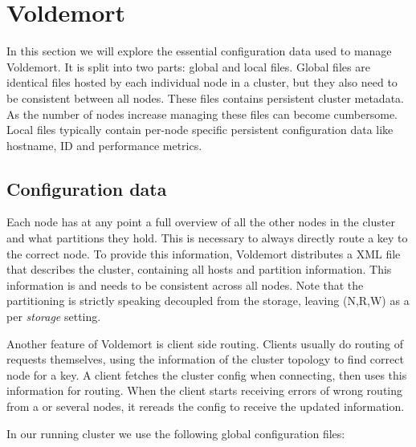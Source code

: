 

\section{Voldemort}
\label{sec:voldemort}
In this section we will explore the essential configuration data used to manage Voldemort. It is split into two parts: global and local files. Global files are identical files hosted by each individual node in a cluster, but they also need to be consistent between all nodes. These files contains persistent cluster metadata. As the number of nodes increase managing these files can become cumbersome. Local files typically contain per-node specific persistent configuration data like hostname, ID and performance metrics.

\subsection{Configuration data}
Each node has at any point a full overview of all the other nodes in the cluster and what partitions they hold. This is necessary to always directly route a key to the correct node.
To provide this information, Voldemort distributes a XML file that describes the cluster, containing all hosts and partition information. This information is and needs to be consistent across all nodes.
Note that the partitioning is strictly speaking decoupled from the storage, leaving (N,R,W) as a per \emph{storage} setting.

Another feature of Voldemort is client side routing. Clients usually do routing of requests themselves, using the information of the cluster topology to find correct node for a key. A client fetches the cluster config when connecting, then uses this information for routing. When the client starts receiving errors of wrong routing from a or several nodes, it rereads the config to receive the updated information.

In our running cluster we use the following global configuration files:

